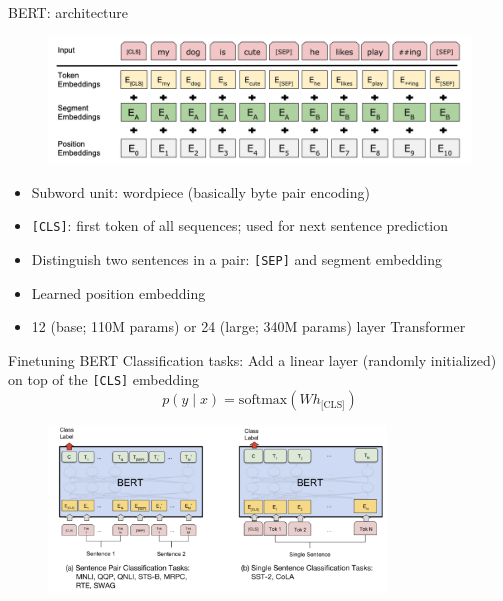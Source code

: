 \documentclass[usenames,dvipsnames,notes,11pt,aspectratio=169,hyperref={colorlinks=true, linkcolor=blue}]{beamer}
\begin{document}
\begin{frame}
    {BERT: architecture}
    \begin{figure}
            \includegraphics[width=.9\textwidth]{figures/bert}
    \end{figure}
    \vspace{-1em}
    \begin{itemize}[<+->]
        \item Subword unit: wordpiece (basically byte pair encoding) 
        \item \texttt{[CLS]}: first token of all sequences; used for next sentence prediction
        \item Distinguish two sentences in a pair: \texttt{[SEP]} and segment embedding
        \item Learned position embedding
        \item 12 (base; 110M params) or 24 (large; 340M params) layer Transformer
    \end{itemize}
\end{frame}

\begin{frame}
    {Finetuning BERT}
        Classification tasks:
            Add a linear layer (randomly initialized) on top of the \texttt{[CLS]} embedding
            $$
            p(y\mid x) = \mathrm{softmax}(Wh_{\text{[CLS]}})
            $$
            \begin{figure}
                \includegraphics[width=0.8\textwidth]{figures/bert-classification}
            \end{figure}
\end{frame}
\end{document}
